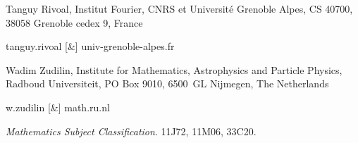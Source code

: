 \documentclass[reqno,12pt]{article}
\theoremstyle{remark}
\begin{document}
\bigskip

\noindent Tanguy Rivoal,  Institut Fourier, CNRS et Universit\'e Grenoble Alpes,  CS 40700, 38058 Grenoble cedex 9, France

\medskip
\noindent tanguy.rivoal [\&] univ-grenoble-alpes.fr

\bigskip 

\noindent Wadim Zudilin, Institute for Mathematics, Astrophysics and Particle Physics,
Radboud Universiteit, PO Box 9010,
6500~GL Nijmegen, The Netherlands

\medskip
\noindent w.zudilin [\&] math.ru.nl

\bigskip
{} \emph{Mathematics Subject Classification}. 11J72, 11M06, 33C20.
\end{document}
